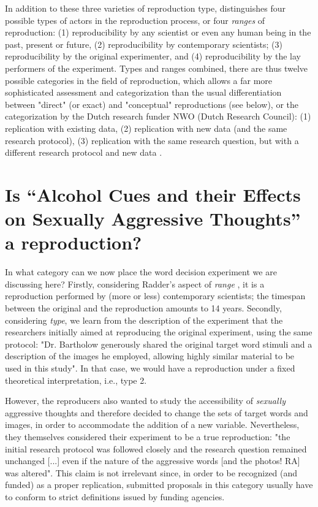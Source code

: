 \documentclass[twocolumn, serif, authordate, reflection]{jote-article}
\begin{document}
In addition to these three varieties of reproduction type, \textcite{Radder1996} distinguishes four possible types of actors in the reproduction process, or four \textit{ranges }of reproduction: (1) reproducibility by any scientist or even any human being in the past, present or future, (2) reproducibility by contemporary scientists; (3) reproducibility by the original experimenter, and (4) reproducibility by the lay performers of the experiment. Types and ranges combined, there are thus twelve possible categories in the field of reproduction, which allows a far more sophisticated assessment and categorization than the usual differentiation between "direct" (or exact) and "conceptual" reproductions (see below), or the categorization by the Dutch research funder NWO (Dutch Research Council): (1) replication with existing data, (2) replication with new data (and the same research protocol), (3) replication with the same research question, but with a different research protocol and new data \parencite{NWO2019}.


{}
\section*{Is ``Alcohol Cues and their Effects on Sexually Aggressive Thoughts” a reproduction?}



In what category can we now place the word decision experiment we are discussing here? Firstly, considering Radder’s aspect of \textit{range }\parencite{Radder1996}, it is a reproduction performed by (more or less) contemporary scientists; the timespan between the original and the reproduction amounts to 14 years. Secondly, considering \textit{type}, we learn from the description of the experiment that the researchers initially aimed at reproducing the original experiment, using the same protocol: "Dr. Bartholow generously shared the original target word stimuli and a description of the images he employed, allowing highly similar material to be used in this study"\parencite[p. 15]{Leboeuf2020}. In that case, we would have a reproduction under a fixed theoretical interpretation, i.e., type 2.
 
However, the reproducers also wanted to study the accessibility of \textit{sexually }aggressive thoughts and therefore decided to change the sets of target words and images, in order to accommodate the addition of a new variable. Nevertheless, they themselves considered their experiment to be a true reproduction: "the initial research protocol was followed closely and the research question remained unchanged [...] even if the nature of the aggressive words [and the photos! RA] was altered"\parencite[p. 16]{Leboeuf2020}. This claim is not irrelevant since, in order to be recognized (and funded) as a proper replication, submitted proposals in this category usually have to conform to strict definitions issued by funding agencies. 
 
\end{document}
